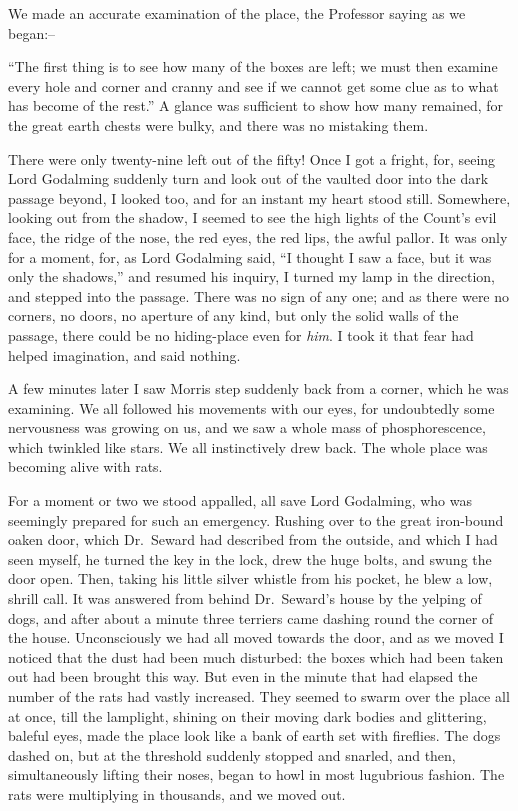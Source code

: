 \documentclass[12pt,openright]{book}
\begin{document}
We made an accurate examination of the place, the Professor saying as we began:–

“The first thing is to see how many of the boxes are left; we must then examine every hole and corner and cranny and see if we cannot get some clue as to what has become of the rest.” A glance was sufficient to show how many remained, for the great earth chests were bulky, and there was no mistaking them.

There were only twenty-nine left out of the fifty! Once I got a fright, for, seeing Lord Godalming suddenly turn and look out of the vaulted door into the dark passage beyond, I looked too, and for an instant my heart stood still. Somewhere, looking out from the shadow, I seemed to see the high lights of the Count’s evil face, the ridge of the nose, the red eyes, the red lips, the awful pallor. It was only for a moment, for, as Lord Godalming said, “I thought I saw a face, but it was only the shadows,” and resumed his inquiry, I turned my lamp in the direction, and stepped into the passage. There was no sign of any one; and as there were no corners, no doors, no aperture of any kind, but only the solid walls of the passage, there could be no hiding-place even for \textit{him}. I took it that fear had helped imagination, and said nothing.

A few minutes later I saw Morris step suddenly back from a corner, which he was examining. We all followed his movements with our eyes, for undoubtedly some nervousness was growing on us, and we saw a whole mass of phosphorescence, which twinkled like stars. We all instinctively drew back. The whole place was becoming alive with rats.

For a moment or two we stood appalled, all save Lord Godalming, who was seemingly prepared for such an emergency. Rushing over to the great iron-bound oaken door, which Dr. Seward had described from the outside, and which I had seen myself, he turned the key in the lock, drew the huge bolts, and swung the door open. Then, taking his little silver whistle from his pocket, he blew a low, shrill call. It was answered from behind Dr. Seward’s house by the yelping of dogs, and after about a minute three terriers came dashing round the corner of the house. Unconsciously we had all moved towards the door, and as we moved I noticed that the dust had been much disturbed: the boxes which had been taken out had been brought this way. But even in the minute that had elapsed the number of the rats had vastly increased. They seemed to swarm over the place all at once, till the lamplight, shining on their moving dark bodies and glittering, baleful eyes, made the place look like a bank of earth set with fireflies. The dogs dashed on, but at the threshold suddenly stopped and snarled, and then, simultaneously lifting their noses, began to howl in most lugubrious fashion. The rats were multiplying in thousands, and we moved out.
\end{document}
